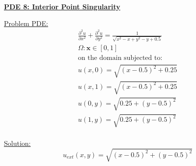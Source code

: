 \documentclass[.\jobname.tex]{subfiles}
\begin{document}
\begin{figure}[H]
	\centering
	\noindent{}
	\label{fig:sol_plot_7}
\end{figure}




\newpage





\underline{\textbf{PDE 8: Interior Point Singularity}} 

\underline{Problem PDE:} 
\begin{equation}
\label{eq:pde8}
\begin{split}
\frac{\partial^2 u}{\partial x^2} + \frac{\partial^2 u}{\partial y^2} = \frac{1}{\sqrt{x^2 - x + y^2 - y + 0.5}} \\
\Omega: \mathbf{x} \in [0,1] \\
\text{on the domain } \text{subjected to: } \\
u(x,0) = \sqrt{(x-0.5)^2 + 0.25} \\
u(x,1) =  \sqrt{(x-0.5)^2 + 0.25} \\
u(0,y) = \sqrt{0.25 + (y-0.5)^2} \\
u(1,y) =  \sqrt{0.25 + (y-0.5)^2} \\
\end{split}
\end{equation}

\underline{Solution:}
\begin{equation}
\label{eq:sol8}
u_{ext}(x,y) = \sqrt{(x-0.5)^2 + (y-0.5)^2}
\end{equation}
\end{document}
